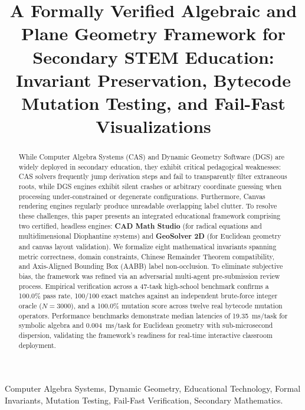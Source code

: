 \documentclass[conference]{IEEEtran}
\begin{document}
\title{A Formally Verified Algebraic and Plane Geometry Framework for Secondary STEM Education: Invariant Preservation, Bytecode Mutation Testing, and Fail-Fast Visualizations}

\author{
}

\maketitle

\begin{abstract}
While Computer Algebra Systems (CAS) and Dynamic Geometry Software (DGS) are widely deployed in secondary education, they exhibit critical pedagogical weaknesses: CAS solvers frequently jump derivation steps and fail to transparently filter extraneous roots, while DGS engines exhibit silent crashes or arbitrary coordinate guessing when processing under-constrained or degenerate configurations. Furthermore, Canvas rendering engines regularly produce unreadable overlapping label clutter. To resolve these challenges, this paper presents an integrated educational framework comprising two certified, headless engines: \textbf{CAD Math Studio} (for radical equations and multidimensional Diophantine systems) and \textbf{GeoSolver 2D} (for Euclidean geometry and canvas layout validation). We formalize eight mathematical invariants spanning metric correctness, domain constraints, Chinese Remainder Theorem compatibility, and Axis-Aligned Bounding Box (AABB) label non-occlusion. To eliminate subjective bias, the framework was refined via an adversarial multi-agent pre-submission review process. Empirical verification across a 47-task high-school benchmark confirms a 100.0\% pass rate, 100/100 exact matches against an independent brute-force integer oracle ($N=3000$), and a 100.0\% mutation score across twelve real bytecode mutation operators. Performance benchmarks demonstrate median latencies of 19.35~ms/task for symbolic algebra and 0.004~ms/task for Euclidean geometry with sub-microsecond dispersion, validating the framework's readiness for real-time interactive classroom deployment.
\end{abstract}

\begin{IEEEkeywords}
Computer Algebra Systems, Dynamic Geometry, Educational Technology, Formal Invariants, Mutation Testing, Fail-Fast Verification, Secondary Mathematics.
\end{IEEEkeywords}
\end{document}
